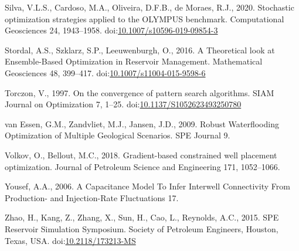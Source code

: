 \documentclass[]{elsarticle} %
\newlength{\cslhangindent}
\newenvironment{CSLReferences}[2] %
 {%
  \setlength{\parindent}{0pt}
  \ifodd #1 \everypar{\setlength{\hangindent}{\cslhangindent}}\ignorespaces\fi
  \ifnum #2 > 0
  \setlength{\parskip}{#2\baselineskip}
  \fi
 }%
 {}
\begin{document}
\begin{CSLReferences}{1}{0}
\leavevmode{}%
Silva, V.L.S., Cardoso, M.A., Oliveira, D.F.B., de Moraes, R.J., 2020. Stochastic optimization strategies applied to the OLYMPUS benchmark. Computational Geosciences 24, 1943--1958. doi:\href{https://doi.org/10.1007/s10596-019-09854-3}{10.1007/s10596-019-09854-3}

\leavevmode{}%
Stordal, A.S., Szklarz, S.P., Leeuwenburgh, O., 2016. A Theoretical look at Ensemble-Based Optimization in Reservoir Management. Mathematical Geosciences 48, 399--417. doi:\href{https://doi.org/10.1007/s11004-015-9598-6}{10.1007/s11004-015-9598-6}

\leavevmode{}%
Torczon, V., 1997. On the convergence of pattern search algorithms. SIAM Journal on Optimization 7, 1--25. doi:\href{https://doi.org/10.1137/S1052623493250780}{10.1137/S1052623493250780}

\leavevmode{}%
van Essen, G.M., Zandvliet, M.J., Jansen, J.D., 2009. Robust Waterflooding Optimization of Multiple Geological Scenarios. SPE Journal 9.

\leavevmode{}%
Volkov, O., Bellout, M.C., 2018. Gradient-based constrained well placement optimization. Journal of Petroleum Science and Engineering 171, 1052--1066.

\leavevmode{}%
Yousef, A.A., 2006. A Capacitance Model To Infer Interwell Connectivity From Production- and Injection-Rate Fluctuations 17.

\leavevmode{}%
Zhao, H., Kang, Z., Zhang, X., Sun, H., Cao, L., Reynolds, A.C., 2015. SPE Reservoir Simulation Symposium. Society of Petroleum Engineers, Houston, Texas, USA. doi:\href{https://doi.org/10.2118/173213-MS}{10.2118/173213-MS}

\end{CSLReferences}
\end{document}

